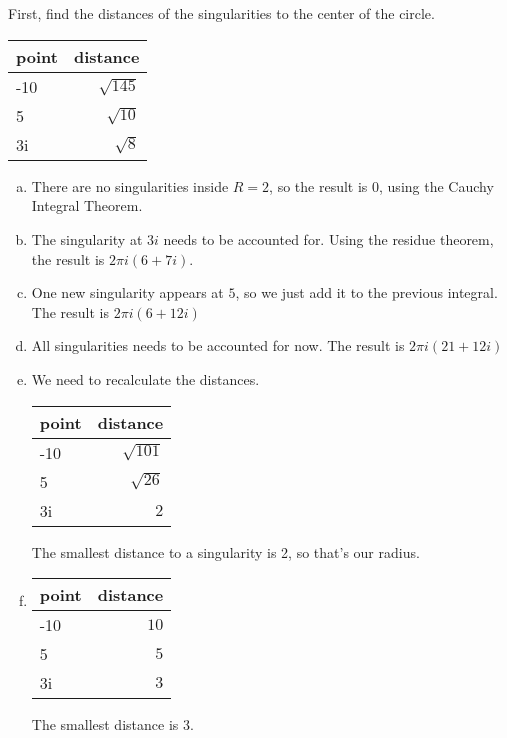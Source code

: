 \documentclass[12pt]{article}
\begin{document}
\section{}
First, find the distances of the singularities to the center of the circle. 
\par \begin{tabular}{|l|r|}
	\hline
	point & distance \\
	\hline\hline
	-10 & $ \sqrt{145} $\\
	5 & $ \sqrt{10} $\\
	3i & $ \sqrt{8} $\\
	\hline
\end{tabular}
\begin{enumerate}[(a)]
	\item There are no singularities inside $ R=2 $, so the result is 0, using the Cauchy Integral Theorem.
	
	\item The singularity at $ 3i $ needs to be accounted for. Using the residue theorem, the result is $ 2\pi i (6+7i) $.
	
	\item One new singularity appears at $ 5 $, so we just add it to the previous integral. The result is $ 2\pi i (6 + 12i) $
	
	\item All singularities needs to be accounted for now. The result is $ 2\pi i (21+12i) $
	
	\item We need to recalculate the distances. \par
	\begin{tabular}{|l|r|}
		\hline
		point & distance \\
		\hline\hline
		-10 & $ \sqrt{101} $\\
		5 & $ \sqrt{26} $\\
		3i & $ 2 $\\
		\hline
	\end{tabular}\par
	The smallest distance to a singularity is 2, so that's our radius.
	
	\item \begin{tabular}{|l|r|}
		\hline
		point & distance \\
		\hline\hline
		-10 & $ 10 $\\
		5 & $ 5 $\\
		3i & $ 3 $\\
		\hline
	\end{tabular}\par
	The smallest distance is 3.
\end{enumerate}
\newpage
\end{document}
